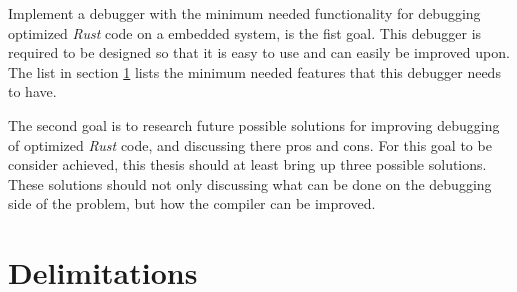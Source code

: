Implement a debugger with the minimum needed functionality for debugging optimized \emph{Rust} code on a embedded system, is the fist goal.
This debugger is required to be designed so that it is easy to use and can easily be improved upon.
The list in section \ref{sec:delimitations} lists the minimum needed features that this debugger needs to have.


The second goal is to research future possible solutions for improving debugging of optimized \emph{Rust} code, and discussing there pros and cons.
For this goal to be consider achieved, this thesis should at least bring up three possible solutions.
These solutions should not only discussing what can be done on the debugging side of the problem, but how the compiler can be improved.








\section{Delimitations}
\label{sec:delimitations}


